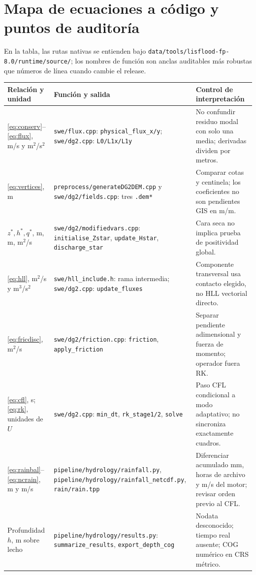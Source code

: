 \documentclass[11pt,a4paper]{article}
\newcommand{\src}[1]{\nolinkurl{#1}}
\begin{document}
\section{Mapa de ecuaciones a código y puntos de auditoría}
\label{sec:mapa}
En la tabla, las rutas nativas se entienden bajo \src{data/tools/lisflood-fp-8.0/runtime/source/}; los nombres de función son anclas auditables más robustas que números de línea cuando cambie el release.
\begin{longtable}{p{.19\linewidth}p{.34\linewidth}p{.38\linewidth}}
\toprule Relación y unidad & Función y salida & Control de interpretación\\\midrule\endhead
\eqref{eq:conserv}--\eqref{eq:flux}, m/s y m$^2$/s$^2$ & \src{swe/flux.cpp}: \texttt{physical\_flux\_x/y}; \src{swe/dg2.cpp}: \texttt{L0/L1x/L1y} & No confundir residuo modal con solo una media; derivadas dividen por metros.\\
\eqref{eq:vertices}, m & \src{preprocess/generateDG2DEM.cpp} y \src{swe/dg2/fields.cpp}: tres \texttt{.dem*} & Comparar cotas y centinela; los coeficientes no son pendientes GIS en m/m.\\
$z^*,h^*,q^*$, m, m, m$^2$/s & \src{swe/dg2/modifiedvars.cpp}: \texttt{initialise\_Zstar}, \texttt{update\_Hstar}, \texttt{discharge\_star} & Cara seca no implica prueba de positividad global.\\
\eqref{eq:hll}, m$^2$/s y m$^3$/s$^2$ & \src{swe/hll_include.h}: rama intermedia; \src{swe/dg2.cpp}: \texttt{update\_fluxes} & Componente transversal usa contacto elegido, no HLL vectorial directo.\\
\eqref{eq:fricdisc}, m$^2$/s & \src{swe/dg2/friction.cpp}: \texttt{friction}, \texttt{apply\_friction} & Separar pendiente adimensional y fuerza de momento; operador fuera RK.\\
\eqref{eq:cfl}, s; \eqref{eq:rk}, unidades de $U$ & \src{swe/dg2.cpp}: \texttt{min\_dt}, \texttt{rk\_stage1/2}, \texttt{solve} & Paso CFL condicional a modo adaptativo; no sincroniza exactamente cuadros.\\
\eqref{eq:rainbal}--\eqref{eq:ncrain}, m y m/s & \src{pipeline/hydrology/rainfall.py}, \src{pipeline/hydrology/rainfall_netcdf.py}, \src{rain/rain.tpp} & Diferenciar acumulado mm, horas de archivo y m/s del motor; revisar orden previo al CFL.\\
Profundidad $h$, m sobre lecho & \src{pipeline/hydrology/results.py}: \texttt{summarize\_results}, \texttt{export\_depth\_cog} & Nodata desconocido; tiempo real ausente; COG numérico en CRS métrico.\\\bottomrule
\end{longtable}
\end{document}

